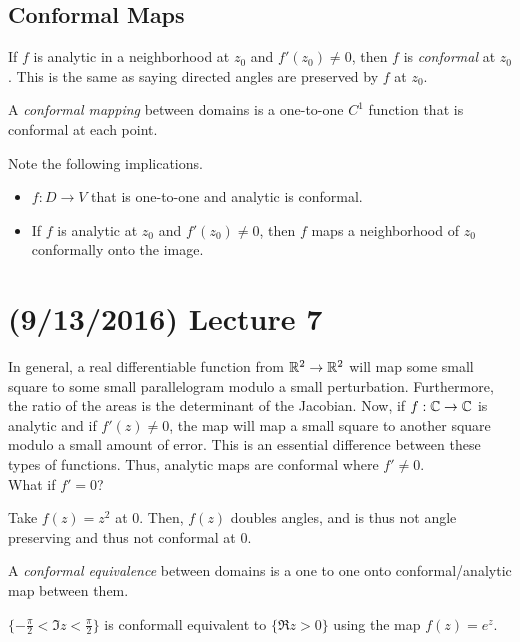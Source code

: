 \documentclass[11pt,leqno,oneside]{amsart}
\begin{document}
\subsection*{Conformal Maps}
\begin{defn}
    If $f$ is analytic in a neighborhood at $z_0$ and $f'(z_0) \neq 0$, then
    $f$ is \emph{conformal} at $z_0$. This is the same as saying directed
    angles are preserved by $f$ at $z_0$.
\end{defn}
\begin{defn}
    A \emph{conformal mapping} between domains is a one-to-one $C^1$ function
    that is conformal at each point.
\end{defn}
Note the following implications.
\begin{itemize}
    \item $f: D \to V$ that is one-to-one and analytic is conformal.
    \item If $f$ is analytic at $z_0$ and $f'(z_0) \neq 0$, then $f$ maps a
        neighborhood of $z_0$ conformally onto the image.
\end{itemize}

\section{(9/13/2016) Lecture 7}
In general, a real differentiable function from ${\mathbb R}^2 \to {\mathbb R}^2$ will map some
small square to some small parallelogram modulo a small
perturbation. Furthermore, the ratio of the areas is the determinant of the
Jacobian. Now, if $f: {\mathbb C} \to {\mathbb C}$ is analytic and if $f'(z) \neq 0$, the map will
map a small square to another square modulo a small amount of error. This is an
essential difference between these types of functions. Thus, analytic maps are
conformal where $f' \neq 0$. \\

What if $f' = 0$?
\begin{example}
  Take $f(z) = z^2$ at 0. Then, $f(z)$ doubles angles, and is thus not angle
  preserving and thus not conformal at 0.
\end{example}

\begin{defn}
  A \emph{conformal equivalence} between domains is a one to one onto
  conformal/analytic map between them.
\end{defn}
\begin{example}
  $\{-\frac{\pi}{2} < \Im z < \frac{\pi}{2}\}$ is conformall equivalent to
  $\{\Re z > 0\}$ using the map $f(z) = e^z$.
\end{example}
\end{document}
